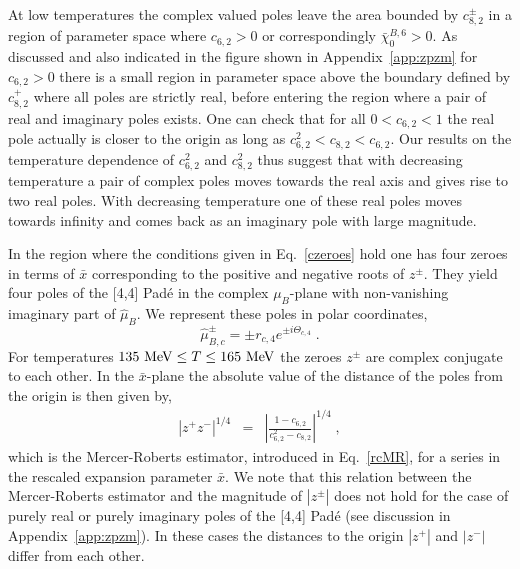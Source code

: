 \documentclass[pdflatex,prd,twocolumn,showpacs,superscriptaddress,nofootinbib]{revtex4-1}
\newcommand \hmu {\hat{\mu}}
\newcommand \xb {\bar{x}}
\newcommand \cb {\bar{\chi}}
\begin{document}
At low temperatures the complex valued poles 
leave the area bounded by $c^\pm_{8,2}$ in a region of parameter space where $c_{6,2}>0$ or correspondingly $\cb_0^{B,6}>0$.
As discussed and also indicated in the figure shown in  Appendix~\ref{app:zpzm} for $c_{6,2}>0$ there is a small region in parameter space above 
the boundary defined by $c_{8,2}^+$ where all poles are 
strictly real, before entering the region where a 
pair of real and imaginary poles exists. One can check
that for all $0<c_{6,2}<1$ the real pole actually is closer to the origin as long as $c^2_{6,2}<c_{8,2}<c_{6,2}$. Our results on the temperature dependence of $c^2_{6,2}$ and $c^2_{8,2}$  thus suggest that with decreasing temperature a pair of complex poles moves towards the real axis and gives rise to two real poles. With decreasing temperature one of these real poles moves towards infinity and comes back as an imaginary pole with
large magnitude.

In the region where the conditions given in Eq.~\ref{czeroes} hold
one has four zeroes in terms of $\xb$ corresponding to the positive and negative roots of $z^\pm$. They yield four poles of the [4,4] Pad\'e in the complex $\mu_B$-plane with non-vanishing
imaginary part of $\hmu_B$. We represent these poles in polar coordinates,
\begin{equation}
    \hmu_{B,c}^\pm = \pm r_{c,4} e^{\pm i \Theta_{c,4}} \; .
    \label{muBplane}
\end{equation}
For temperatures $135~{\rm MeV}\le T\le 165~{\rm MeV}$ the zeroes $z^\pm$ are complex conjugate to each other. In the $\xb$-plane the absolute value of
the distance of the poles from the origin is then given by,
\begin{eqnarray}
 |z^+ z^-|^{1/4}
    &=&\left| 
    \frac{1-c_{6,2}}{c_{6,2}^2-c_{8,2}}\right|^{1/4} \; ,
	\label{estimator}
\end{eqnarray}
which is the Mercer-Roberts estimator, introduced in Eq.~\ref{rcMR}, for a series in the rescaled expansion parameter $\xb$. We note that this  relation between the Mercer-Roberts estimator and the magnitude of $|z^\pm|$ does not hold for 
the case of purely real or purely imaginary poles of the [4,4] Pad\'e
(see discussion in Appendix~\ref{app:zpzm}).
In these cases the 
distances to the origin $|z^+|$ and $|z^-|$ differ
from each other.
\end{document}
